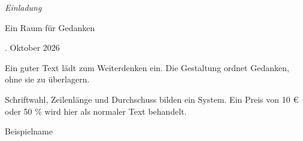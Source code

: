 \documentclass[11pt,a4paper,ngerman]{scrartcl}
\begin{document}
\begin{center}
{\normalsize\itshape Einladung\par}
\bigskip
{\LARGE Ein Raum für Gedanken\par}
. Oktober 2026\par
\end{center}
\bigskip
Ein guter Text lädt zum Weiterdenken ein. Die Gestaltung ordnet Gedanken, ohne sie zu überlagern.

Schriftwahl, Zeilenlänge und Durchschuss bilden ein System. Ein Preis von 10 € oder 50 \% wird hier als normaler Text behandelt.
\bigskip
\begin{flushright}
Beispielname
\end{flushright}
\end{document}
